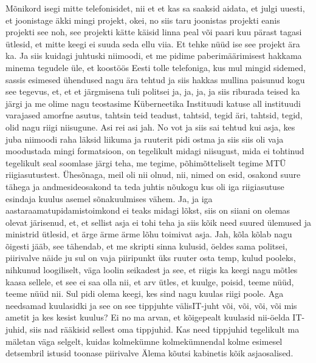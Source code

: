 Mõnikord isegi mitte telefonisidet, nii et et kas sa saaksid aidata, et julgi uuesti, et joonistage äkki mingi projekt, okei, no siis taru joonistas projekti eanis projekti see noh, see projekti kätte käisid linna peal või paari kuu pärast tagasi ütlesid, et mitte keegi ei suuda seda ellu viia. Et tehke nüüd ise see projekt ära ka. Ja siis kuidagi juhtuski niimoodi, et me pidime paberimäärimisest hakkama minema tegudele üle, et koostöös Eesti tolle telefoniga, kus mul mingid sidemed, sassis esimesed ühendused nagu ära tehtud ja siis hakkas mullina paisunud kogu see tegevus, et, et et järgmisena tuli politsei ja, ja, ja, ja siis riburada teised ka järgi ja me olime nagu teostasime Küberneetika Instituudi katuse all instituudi varajased amorfne asutus, tahtsin teid teadust, tahtsid, tegid äri, tahtsid, tegid, olid nagu riigi niisugune.
Asi rei asi jah. No vot ja siis sai tehtud kui asja, kes juba niimoodi raha läksid liikuma ja ruuterit pidi ostma ja siis siis oli vaja moodustada mingi formatsioon, on tegelikult midagi niisugust, mida ei tohtinud tegelikult seal soomlase järgi teha, me tegime, põhimõtteliselt tegime MTÜ riigiasutustest. Ühesõnaga, meil oli nii olnud, nii, nimed on esid, osakond suure tähega ja andmesideosakond ta teda juhtis nõukogu kus oli iga riigiasutuse esindaja kuulus asemel sõnakuulmises vähem. Ja, ja iga aastaraamatupidamistoimkond ei teaks midagi lõkst, siis on siiani on olemas olevat järisenud, et, et sellist asja ei tohi teha ja siis kõik need suured ülemused ja ministrid ütlesid, et ärge ärme ärme lõhu toimivat asja. Jah, kõla kõlab nagu õigesti jääb, see tähendab, et me skripti sinna kulusid, öeldes sama politsei, piirivalve näide ju sul on vaja piiripunkt üks ruuter osta temp, kulud pooleks, nihkunud loogiliselt, väga loolin seikadest ja see, et riigis ka keegi nagu mõtles kaasa sellele, et see ei saa olla nii, et arv ütles, et kuulge, poisid, teeme nüüd, teeme nüüd nii. Sul pidi olema keegi, kes sind nagu kuulas riigi poole.
Aga needsamad kuulasidki ja see on see tippjuhte välisIT-juht või, või, või, või mis ametit ja kes kesist kuulus? Ei no ma arvan, et kõigepealt kuulasid nii-öelda IT-juhid, siis nad rääkisid sellest oma tippjuhid. Kas need tippjuhid tegelikult ma mäletan väga selgelt, kuidas kolmekümne kolmekümnendal kolme esimesel detsembril istusid toonase piirivalve
Älema kõutsi kabinetis kõik asjaosalised.
